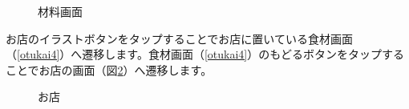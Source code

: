 \documentclass[a4j]{jarticle}
\begin{document}
\begin{figure}[H]
    \begin{center}
    \caption {材料画面}
    \label{otukai2}
    \end{center}
\end{figure}

お店のイラストボタンをタップすることでお店に置いている食材画面（\ref{otukai4}）へ遷移します。食材画面（\ref{otukai4}）のもどるボタンをタップすることでお店の画面（図\ref{otukai3}）へ遷移します。

\begin{figure}[H]
    \begin{center}
    \caption {お店}
    \label{otukai3}
    \end{center}
\end{figure}
\end{document}
